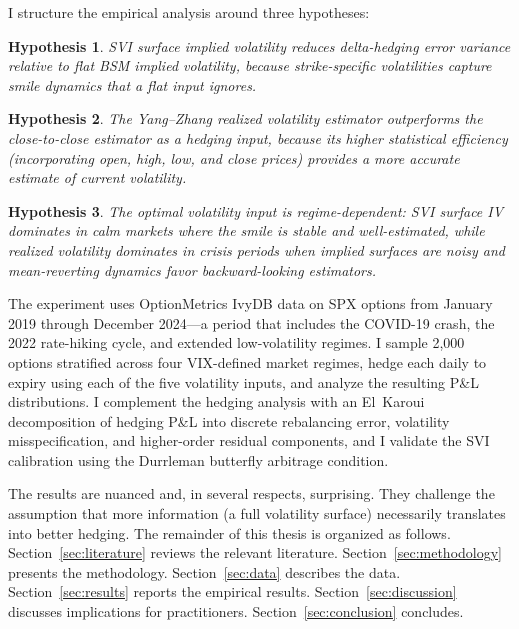 \documentclass[12pt, letterpaper]{article}
\newtheorem{hypothesis}{Hypothesis}
\begin{document}
I structure the empirical analysis around three hypotheses:

\begin{hypothesis}
\label{hyp:svi}
SVI surface implied volatility reduces delta-hedging error variance relative to flat BSM implied volatility, because strike-specific volatilities capture smile dynamics that a flat input ignores.
\end{hypothesis}

\begin{hypothesis}
\label{hyp:yz}
The Yang--Zhang realized volatility estimator outperforms the close-to-close estimator as a hedging input, because its higher statistical efficiency (incorporating open, high, low, and close prices) provides a more accurate estimate of current volatility.
\end{hypothesis}

\begin{hypothesis}
\label{hyp:regime}
The optimal volatility input is regime-dependent: SVI surface IV dominates in calm markets where the smile is stable and well-estimated, while realized volatility dominates in crisis periods when implied surfaces are noisy and mean-reverting dynamics favor backward-looking estimators.
\end{hypothesis}

The experiment uses OptionMetrics IvyDB data on SPX options from January 2019 through December 2024---a period that includes the COVID-19 crash, the 2022 rate-hiking cycle, and extended low-volatility regimes. I sample 2,000 options stratified across four VIX-defined market regimes, hedge each daily to expiry using each of the five volatility inputs, and analyze the resulting P\&L distributions. I complement the hedging analysis with an El~Karoui decomposition of hedging P\&L into discrete rebalancing error, volatility misspecification, and higher-order residual components, and I validate the SVI calibration using the Durrleman butterfly arbitrage condition.

The results are nuanced and, in several respects, surprising. They challenge the assumption that more information (a full volatility surface) necessarily translates into better hedging. The remainder of this thesis is organized as follows. Section~\ref{sec:literature} reviews the relevant literature. Section~\ref{sec:methodology} presents the methodology. Section~\ref{sec:data} describes the data. Section~\ref{sec:results} reports the empirical results. Section~\ref{sec:discussion} discusses implications for practitioners. Section~\ref{sec:conclusion} concludes.
\end{document}
